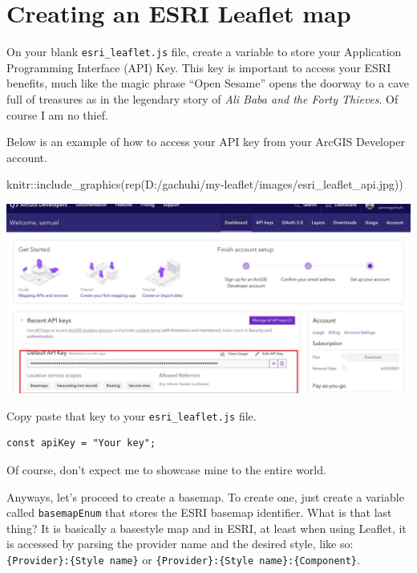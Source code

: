 \documentclass[
]{book}
\newenvironment{Shaded}{\begin{snugshade}}{\end{snugshade}}
\newcommand{\FunctionTok}[1]{\textcolor[rgb]{0.00,0.00,0.00}{#1}}
\newcommand{\NormalTok}[1]{#1}
\newcommand{\SpecialCharTok}[1]{\textcolor[rgb]{0.00,0.00,0.00}{#1}}
\newcommand{\StringTok}[1]{\textcolor[rgb]{0.31,0.60,0.02}{#1}}
\begin{document}
\hypertarget{creating-an-esri-leaflet-map}{%
\section{Creating an ESRI Leaflet map}\label{creating-an-esri-leaflet-map}}

On your blank \texttt{esri\_leaflet.js} file, create a variable to store your Application Programming Interface (API) Key. This key is important to access your ESRI benefits, much like the magic phrase ``Open Sesame'' opens the doorway to a cave full of treasures as in the legendary story of \emph{Ali Baba and the Forty Thieves}. Of course I am no thief.

Below is an example of how to access your API key from your ArcGIS Developer account.

\begin{Shaded}
\begin{Highlighting}[]
\NormalTok{knitr}\SpecialCharTok{::}\FunctionTok{include\_graphics}\NormalTok{(}\FunctionTok{rep}\NormalTok{(}\StringTok{\textquotesingle{}D:/gachuhi/my{-}leaflet/images/esri\_leaflet\_api.jpg\textquotesingle{}}\NormalTok{))}
\end{Highlighting}
\end{Shaded}

\includegraphics[width=26.22in]{../images/esri_leaflet_api}

Copy paste that key to your \texttt{esri\_leaflet.js} file.

\begin{verbatim}
const apiKey = "Your key";
\end{verbatim}

Of course, don't expect me to showcase mine to the entire world.

Anyways, let's proceed to create a basemap. To create one, just create a variable called \texttt{basemapEnum} that stores the ESRI basemap identifier. What is that last thing? It is basically a basestyle map and in ESRI, at least when using Leaflet, it is accessed by parsing the provider name and the desired style, like so: \texttt{\{Provider\}:\{Style\ name\}} or
\texttt{\{Provider\}:\{Style\ name\}:\{Component\}}.
\end{document}
